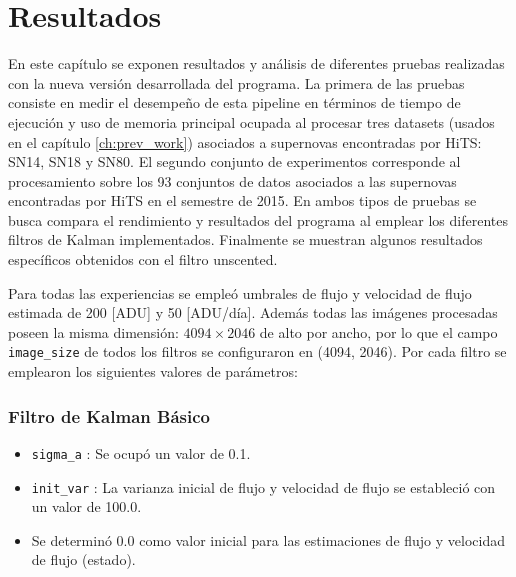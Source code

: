 \chapter{Resultados}
\label{ch:resultados}
En este cap\'itulo se exponen resultados y an\'alisis de diferentes pruebas realizadas con la nueva versi\'on desarrollada del programa. La primera de las pruebas consiste en medir el desempe\~no de esta pipeline en t\'erminos de tiempo de ejecuci\'on y uso de memoria principal ocupada al procesar tres datasets (usados en el cap\'itulo \ref{ch:prev_work}) asociados a supernovas encontradas por HiTS\cite{hits}: SN14, SN18 y SN80. El segundo conjunto de experimentos corresponde al procesamiento sobre los 93 conjuntos de datos asociados a las supernovas encontradas por HiTS en el semestre de 2015. En ambos tipos de pruebas se busca compara el rendimiento y resultados del programa al emplear los diferentes filtros de Kalman implementados. Finalmente se muestran algunos resultados espec\'ificos obtenidos con el filtro unscented.
\bigskip


Para todas las experiencias se emple\'o umbrales de flujo y velocidad de flujo estimada de 200 [ADU] y 50 [ADU/d\'ia]. Adem\'as todas las im\'agenes procesadas poseen la misma dimensi\'on: $4094 \times 2046$ de alto por ancho, por lo que el campo \texttt{image\_size} de todos los filtros se configuraron en (4094, 2046). Por cada filtro se emplearon los siguientes valores de par\'ametros:

\subsection*{Filtro de Kalman B\'asico}
\begin{itemize}
\item \texttt{sigma\_a} : Se ocup\'o un valor de 0.1.
\item \texttt{init\_var} : La varianza inicial de flujo y velocidad de flujo se estableci\'o con un valor de 100.0.
\item Se determin\'o 0.0 como valor inicial para las estimaciones de flujo y velocidad de flujo (estado).
\end{itemize}
